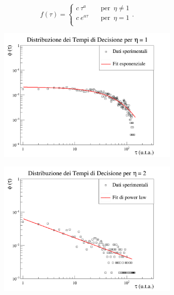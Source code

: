 \documentclass[letterpaper,10pt]{article}
\begin{document}
\begin{equation}
f(\tau)=\begin{cases}
          c \ \tau ^{a} \quad &\text{per } \, \eta \neq 1 \\
          c \ e^{a \tau} \quad &\text{per } \, \eta = 1 \\
     \end{cases} .
\label{Eq:13}
\end{equation}

\begin{figure}[h]
\centering
\begin{subfigure}{0.8\textwidth}
\includegraphics[width=\linewidth]{partial_time_graph_v1.png}
\end{subfigure}
\begin{subfigure}{0.8\textwidth}
\includegraphics[width=\linewidth]{partial_time_graph_v2.png}
\end{subfigure}
\end{figure}
\end{document}
